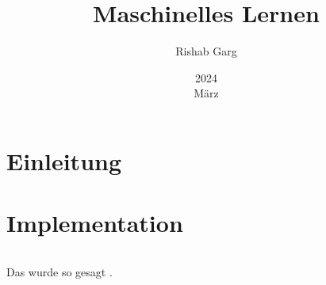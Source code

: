 \documentclass[10pt,titlepage]{article}
\title{Maschinelles Lernen}
\author{Rishab Garg}
\date{2024 \\ März}
\begin{document}
\maketitle

\begin{abstract}
  \blindtext
\end{abstract}

\tableofcontents

\section{Einleitung}

\blindmathpaper

\section{Implementation}

\inputminted[bgcolor=bg]{c}{../native/src/ml.c}

Das wurde so gesagt \autocite{abramsky_hard_2002}.

\printbibliography[heading=bibintoc]
\end{document}
